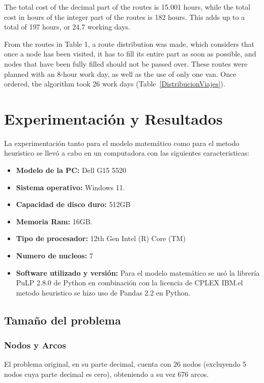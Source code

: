 \documentclass{amsart}
\begin{document}
        The total cost of the decimal part of the routes is 15.001 hours, while the total cost in hours of the integer part of the routes is 182 hours. This adds up to a total of 197 hours, or 24.7 working days.
        
    From the routes in Table 1, a route distribution was made, which considers that once a node has been visited, it has to fill its entire part as soon as possible, and nodes that have been fully filled should not be passed over. These routes were planned with an 8-hour work day, as well as the use of only one van. Once ordered, the algorithm took 26 work days (Table~\ref{DistribucionViajes}).




    \section{Experimentación y Resultados}
    La experimentación tanto para el modelo matemático como para el metodo heuristico se llevó a cabo en un computadora con las siguientes caracteristicas:
    \begin{itemize}
        \item \textbf{Modelo de la PC:} Dell G15 5520
        \item \textbf{Sistema operativo:} Windows 11.
        \item \textbf{Capacidad de disco duro:} 512GB
        \item \textbf{Memoria Ram:} 16GB\@.
        \item \textbf{Tipo de procesador:} 12th Gen Intel (R) Core (TM)
        \item \textbf{Numero de nucleos:} 7
        \item \textbf{Software utilizado y versión:} Para el modelo matemático se usó la librería PuLP 2.8.0 de Python en combinación con la licencia de CPLEX IBM.\@Para el metodo heuristico se hizo uso de Pandas 2.2 en Python.
    \end{itemize}

        \subsection{Tamaño del problema}
            \subsubsection{Nodos y Arcos}
            El problema original, en su parte decimal, cuenta con 26 nodos (excluyendo 5 nodos cuya parte decimal es cero), obteniendo a su vez 676 arcos.
\end{document}

